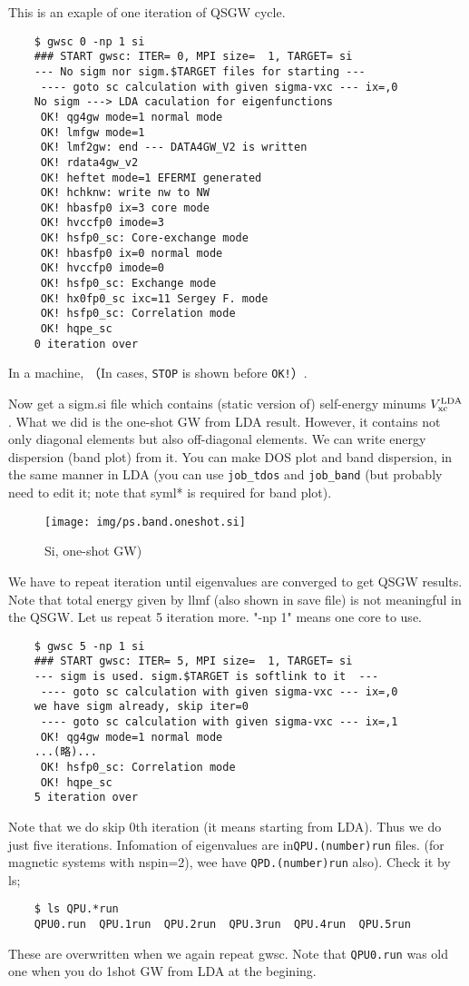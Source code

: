 \documentclass[a4paper,10pt,epsf,fleqn]{article}
\begin{document}
This is an exaple of one iteration of QSGW cycle.
\begin{verbatim}
    $ gwsc 0 -np 1 si
    ### START gwsc: ITER= 0, MPI size=  1, TARGET= si
    --- No sigm nor sigm.$TARGET files for starting ---
     ---- goto sc calculation with given sigma-vxc --- ix=,0
    No sigm ---> LDA caculation for eigenfunctions 
     OK! qg4gw mode=1 normal mode
     OK! lmfgw mode=1 
     OK! lmf2gw: end --- DATA4GW_V2 is written 
     OK! rdata4gw_v2
     OK! heftet mode=1 EFERMI generated 
     OK! hchknw: write nw to NW
     OK! hbasfp0 ix=3 core mode 
     OK! hvccfp0 imode=3
     OK! hsfp0_sc: Core-exchange mode
     OK! hbasfp0 ix=0 normal mode 
     OK! hvccfp0 imode=0
     OK! hsfp0_sc: Exchange mode
     OK! hx0fp0_sc ixc=11 Sergey F. mode
     OK! hsfp0_sc: Correlation mode
     OK! hqpe_sc 
    0 iteration over
\end{verbatim}
In a machine, （In cases, \verb+STOP+ is shown before \verb+OK!+）.

Now get a sigm.si file which contains (static version of) self-energy
minums $V_{\rm xc}^{\rm LDA}$. What we did is the one-shot GW from LDA
result. However, it contains not only diagonal
elements but also off-diagonal elements. We can write energy
dispersion (band plot) from it.
You can make DOS plot and band dispersion,
in the same manner in LDA (you can use 
\verb+job_tdos+ and \verb+job_band+ (but probably need to edit it;
note that syml* is required for band plot).

\begin{figure}[h]
 \begin{center}
  \texttt{[image: img/ps.band.oneshot.si]}
  \caption{Si, one-shot GW)}
 \end{center}
\end{figure}

We have to repeat iteration until eigenvalues are converged to get
QSGW results.
Note that total energy given by llmf (also shown in save file) is not meaningful
in the QSGW. Let us repeat 5 iteration more. "-np 1" means one core to use.
\begin{verbatim}
    $ gwsc 5 -np 1 si
    ### START gwsc: ITER= 5, MPI size=  1, TARGET= si
    --- sigm is used. sigm.$TARGET is softlink to it  ---
     ---- goto sc calculation with given sigma-vxc --- ix=,0
    we have sigm already, skip iter=0
     ---- goto sc calculation with given sigma-vxc --- ix=,1
     OK! qg4gw mode=1 normal mode
    ...(略)...
     OK! hsfp0_sc: Correlation mode
     OK! hqpe_sc 
    5 iteration over
\end{verbatim}
Note that we do skip 0th iteration (it means starting from LDA).
Thus we do just five iterations.
Infomation of eigenvalues are in\verb+QPU.(number)run+ files.
(for magnetic systems with nspin=2), wee have \verb+QPD.(number)run+ also).
Check it by ls;
\begin{verbatim}
    $ ls QPU.*run
    QPU0.run  QPU.1run  QPU.2run  QPU.3run  QPU.4run  QPU.5run
\end{verbatim}
These are overwritten when we again repeat gwsc.
Note that \verb+QPU0.run+ was old one when you do 1shot GW from LDA at
the begining.
\end{document}
